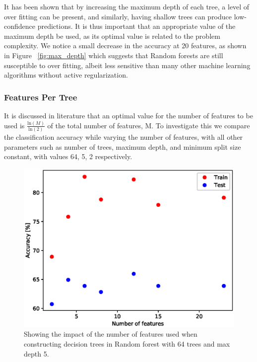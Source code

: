 \documentclass{article} %
\begin{document}
It has been shown that by increasing the maximum depth of each tree, a level of over fitting can be present, and similarly, having shallow trees can produce low-confidence predictions. \cite{Criminisi2011} It is thus important that an appropriate value of the maximum depth be used, as its optimal value is related to the problem complexity. We notice a small decrease in the accuracy at 20 features, as shown in Figure ~\ref{fig:max_depth} which suggests that Random forests are still susceptible to over fitting, albeit less sensitive than many other machine learning algorithms without active regularization.

\subsubsection{Features Per Tree}

It is discussed in literature that an optimal value for the number of features to be used is $\frac{\text{ln}(M)}{\text{ln}(2)}$ of the total number of features, M. \cite{Brieman01} To investigate this we compare the classification accuracy while varying the number of features, with all other parameters such as number of trees, maximum depth, and minimum split size constant, with values 64, 5, 2 respectively. 

\begin{figure}[ht]
\begin{center}
\includegraphics[scale=0.4]{n_features}
\end{center}
\caption{Showing the impact of the number of features used when constructing decision trees in Random forest with 64 trees and max depth 5.}
\label{fig:n_features}
\end{figure}
\end{document}
